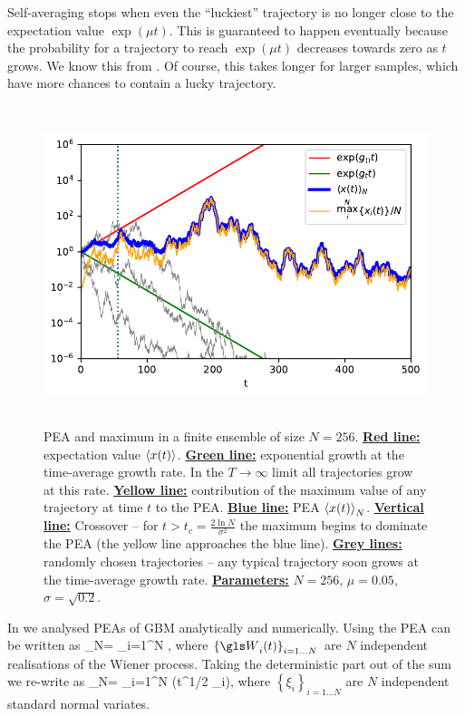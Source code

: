 Self-averaging stops when even the ``luckiest'' trajectory is no longer close to the expectation value $\exp(\mu t)$. This is guaranteed to happen eventually because the probability for a trajectory to reach $\exp(\mu t)$ decreases towards zero as $t$ grows. We know this from . Of course, this takes longer for larger samples, which have more chances to contain a lucky trajectory. 

\begin{figure}
\centering
\includegraphics[height=9.3cm]{./chapter_3/figs/trajectories.pdf}
\caption{PEA and maximum in a finite ensemble of size $N=256$. {\bf \underline{Red line:}} expectation value $\left\langle x(t) \right\rangle$. 
{\bf \underline{Green line:}} exponential growth at the time-average growth rate. In the $T\to\infty$ limit all trajectories grow at this rate. 
{\bf \underline{Yellow line:}} contribution of the maximum value of any trajectory at time $t$ to the PEA.  
{\bf \underline{Blue line:}} PEA $\left\langle x(t) \right\rangle_N$.
{\bf \underline{Vertical line:}} Crossover -- for $t>t_c=\frac{2\ln N}{\sigma^2}$ the maximum begins to dominate the PEA (the yellow line approaches the blue line).
{\bf \underline{Grey lines:}} randomly chosen trajectories -- any typical trajectory soon grows at the time-average growth rate.  
{\bf \underline{Parameters:}} $N=256$, $\mu=0.05$, $\sigma=\sqrt{0.2}$.}
\end{figure}
\FloatBarrier

In \cite{PetersKlein2013} we analysed PEAs of GBM analytically and numerically. Using  the PEA can be written as
\be
{}_N= \sum_{i=1}^N \exp{},
\ee
where $\left\{\gW_i(t)\right\}_{i=1\dots N}$ are $N$ independent realisations of the Wiener process. Taking the deterministic part out of the sum we re-write  as
\be
{}_N=\exp{}  \sum_{i=1}^N \exp\left(t^{1/2} \sigma \xi_i\right),
\ee
where $\left\{\xi_i\right\}_{i=1\dots N}$ are $N$ independent standard normal variates.

